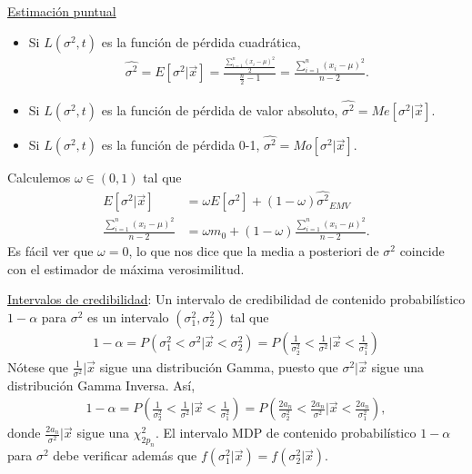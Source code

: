 \underline{Estimación puntual}
\begin{itemize}
    \item Si $L(\sigma^2,t)$ es la función de pérdida cuadrática,
          \begin{align*}
              \widehat{\sigma^2} = E[\sigma^2 |  \vec{x}] = \frac{\frac{ \sum_{i=1}^{n} (x_i- \mu)^2}{2}}{\frac{n}{2}-1} = \frac{\sum_{i=1}^{n} (x_i- \mu)^2}{n-2}.
          \end{align*}
    \item Si $L(\sigma^2,t)$ es la función de pérdida de valor absoluto, $\widehat{\sigma^2} = Me[\sigma^2 |  \vec{x}]$.
    \item Si $L(\sigma^2,t)$ es la función de pérdida 0-1, $ \widehat{\sigma^2} = Mo[\sigma^2 |  \vec{x}]$.
\end{itemize}
Calculemos $\omega \in (0,1)$ tal que
\begin{align*}
    E[\sigma^2  | \vec{x}]                  & = \omega E[\sigma^2]  + (1 - \omega) \widehat{\sigma^2 }_{EMV}      \\
    \frac{\sum_{i=1}^{n} (x_i- \mu)^2}{n-2} & = \omega m_0 + (1-\omega) \frac{\sum_{i=1}^{n}{(x_i -\mu)^2}}{n-2}.
\end{align*}
Es fácil ver que $\omega = 0$, lo que nos dice que la media a posteriori de $\sigma^2$ coincide con el estimador de máxima verosimilitud.

\underline{Intervalos de credibilidad}: Un intervalo de credibilidad de contenido probabilístico $1-\alpha$ para $\sigma^2$ es un intervalo $(\sigma_1^2, \sigma_2^2)$ tal que
\begin{align*}
    1 - \alpha = P(\sigma_1^2 < \sigma^2 | \vec{x} < \sigma_2^2) = P\left( \frac{1}{\sigma_2^2} < \frac{1}{\sigma^2} |  \vec{x} < \frac{1}{\sigma_1^2} \right)
\end{align*}
Nótese que $\frac{1}{\sigma^2} | \vec{x}$ sigue una distribución Gamma, puesto que $\sigma^2 | \vec{x}$ sigue una distribución Gamma Inversa. Así,
\begin{align*}
    1 - \alpha = P\left( \frac{1}{\sigma_2^2} < \frac{1}{\sigma^2} |  \vec{x} < \frac{1}{\sigma_1^2} \right) = P\left( \frac{2a_n}{\sigma_2^2} < \frac{2a_n}{\sigma^2} |  \vec{x} < \frac{2a_n}{\sigma_1^2} \right),
\end{align*}
donde $\frac{2a_n}{\sigma^2} | \vec{x}$ sigue una $\chi^2_{2p_n}$. El intervalo MDP de contenido probabilístico $1-\alpha$ para $\sigma^2$ debe verificar además que $f(\sigma_1^2 | \vec{x}) = f(\sigma_2^2 | \vec{x})$.

